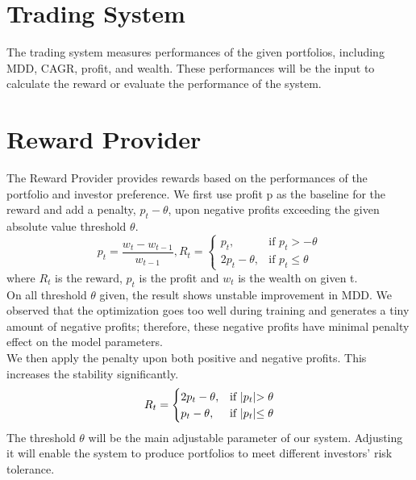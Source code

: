 \section {Trading System}
The trading system measures performances of the given portfolios, including MDD, CAGR, profit, and wealth. These performances will be the input to calculate the reward or evaluate the performance of the system. 

\section {Reward Provider}
The Reward Provider provides rewards based on the performances of the portfolio and investor preference. We first use profit p as the baseline for the reward and add a penalty, \(p_t-\theta\), upon negative profits exceeding the given absolute value threshold \(\theta\). 
\[
p_t = \frac{w_t-w_{t-1}}{w_{t-1}}
, 
R_t = 
\begin{cases}
    p_t,&\text{if  }p_t > -\theta\\
    2p_t - \theta ,&\text{if  }p_t \leq  \theta
\end{cases}
\]
where \(R_t\) is the reward, \(p_t\) is the profit and \(w_t\) is the wealth on given t.
\\
On all threshold \(\theta\) given, the result shows unstable improvement in MDD. We observed that the optimization goes too well during training and generates a tiny amount of negative profits; therefore, these negative profits have minimal penalty effect on the model parameters.
\\
We then apply the penalty upon both positive and negative profits. This increases the stability significantly.
\[
R_t = 
\begin{cases}
    2p_t - \theta,&\text{if  }    $$|p_t|$$ > \theta\\
    p_t - \theta ,&\text{if  } $$|p_t|$$\leq  \theta
\end{cases}
\]
The threshold \(\theta\) will be the main adjustable parameter of our system. Adjusting it will enable the system to produce portfolios to meet different investors' risk tolerance.
